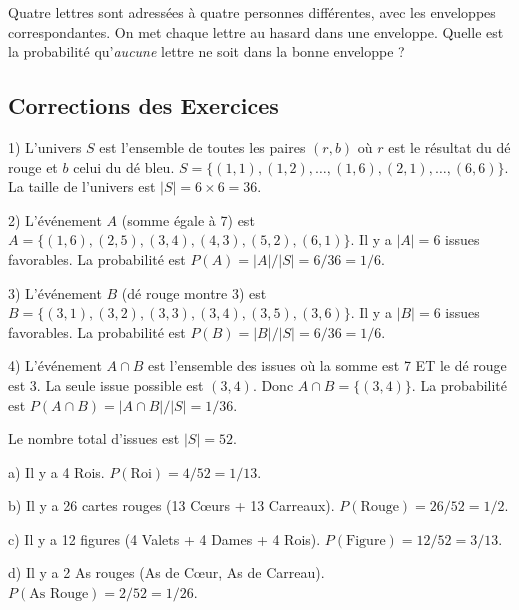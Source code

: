 \begin{exercicebox}
Quatre lettres sont adressées à quatre personnes différentes, avec les enveloppes correspondantes. On met chaque lettre au hasard dans une enveloppe. Quelle est la probabilité qu'\textit{aucune} lettre ne soit dans la bonne enveloppe ?
\end{exercicebox}



\subsection{Corrections des Exercices}


\begin{correctionbox}
1) L'univers $S$ est l'ensemble de toutes les paires $(r, b)$ où $r$ est le résultat du dé rouge et $b$ celui du dé bleu. $S = \{ (1,1), (1,2), \dots, (1,6), (2,1), \dots, (6,6) \}$. La taille de l'univers est $|S| = 6 \times 6 = 36$.

2) L'événement $A$ (somme égale à 7) est $A = \{ (1,6), (2,5), (3,4), (4,3), (5,2), (6,1) \}$. Il y a $|A|=6$ issues favorables. La probabilité est $P(A) = |A|/|S| = 6/36 = 1/6$.

3) L'événement $B$ (dé rouge montre 3) est $B = \{ (3,1), (3,2), (3,3), (3,4), (3,5), (3,6) \}$. Il y a $|B|=6$ issues favorables. La probabilité est $P(B) = |B|/|S| = 6/36 = 1/6$.

4) L'événement $A \cap B$ est l'ensemble des issues où la somme est 7 ET le dé rouge est 3. La seule issue possible est $(3,4)$. Donc $A \cap B = \{ (3,4) \}$. La probabilité est $P(A \cap B) = |A \cap B|/|S| = 1/36$.
\end{correctionbox}

\begin{correctionbox}
Le nombre total d'issues est $|S| = 52$.

a) Il y a 4 Rois. $P(\text{Roi}) = 4/52 = 1/13$.

b) Il y a 26 cartes rouges (13 Cœurs + 13 Carreaux). $P(\text{Rouge}) = 26/52 = 1/2$.

c) Il y a 12 figures (4 Valets + 4 Dames + 4 Rois). $P(\text{Figure}) = 12/52 = 3/13$.

d) Il y a 2 As rouges (As de Cœur, As de Carreau). $P(\text{As Rouge}) = 2/52 = 1/26$.
\end{correctionbox}

